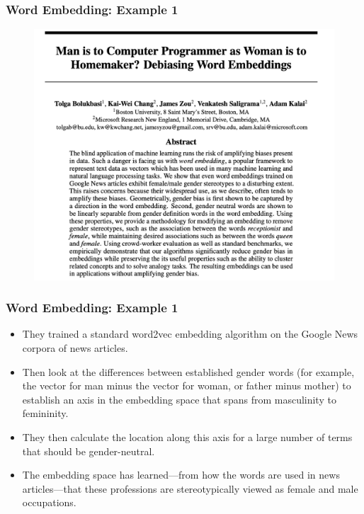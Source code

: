 \documentclass[
  shownotes,
  xcolor={svgnames},
  hyperref={colorlinks,citecolor=DarkBlue,linkcolor=DarkRed,urlcolor=DarkBlue}
  , aspectratio=169]{beamer}
\begin{document}
\begin{frame}
\frametitle{Word Embedding: Example 1 }


  \begin{figure}[H] \centering
            \captionsetup{justification=centering}
              \includegraphics[scale=0.4]{figures/bolukbasi}
              
 \end{figure}

 \end{frame}
\begin{frame}
\frametitle{Word Embedding: Example 1 }

\begin{itemize}


\item They trained a standard word2vec embedding algorithm on the Google News corpora of news articles. 
\item Then look at the differences between established gender words (for example, the vector for man minus the vector for woman, or father minus mother) to establish an axis in the embedding space that spans from masculinity to femininity. 
\item They then calculate the location along this axis for a large number of terms that should be gender-neutral. 
\item  The embedding space has learned—from how the words are used in news articles—that these professions are stereotypically viewed as female and male occupations.
\end{itemize}

\end{frame}
\end{document}
